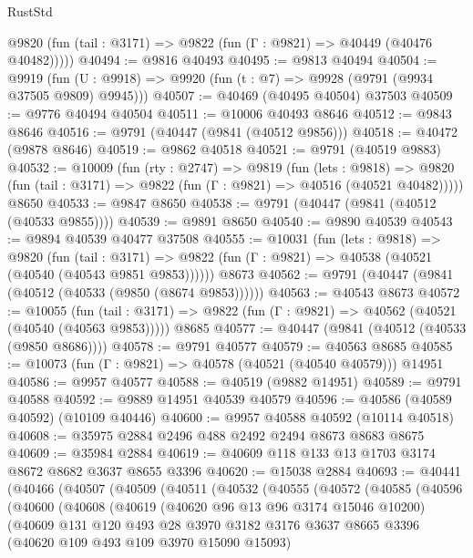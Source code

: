 \begin{lexlean}{RustStd}
\begin{coremodule}
      @9820 (fun (tail : @3171) => @9822 (fun (Γ : @9821) => @40449 (@40476 @40482)))))
@40494 := @9816 @40493
@40495 := @9813 @40494
@40504 := @9919
    (fun (U : @9918) => @9920 (fun (t : @7) => @9928 (@9791 (@9934 @37505 @9809) @9945)))
@40507 := @40469 (@40495 @40504) @37503
@40509 := @9776 @40494 @40504
@40511 := @10006 @40493 @8646
@40512 := @9843 @8646
@40516 := @9791 (@40447 (@9841 (@40512 @9856)))
@40518 := @40472 (@9878 @8646)
@40519 := @9862 @40518
@40521 := @9791 (@40519 @9883)
@40532 := @10009
    (fun (rty : @2747) =>
    @9819
      (fun (lets : @9818) =>
      @9820 (fun (tail : @3171) => @9822 (fun (Γ : @9821) => @40516 (@40521 @40482)))))
    @8650
@40533 := @9847 @8650
@40538 := @9791 (@40447 (@9841 (@40512 (@40533 @9855))))
@40539 := @9891 @8650
@40540 := @9890 @40539
@40543 := @9894 @40539 @40477 @37508
@40555 := @10031
    (fun (lets : @9818) =>
    @9820
      (fun (tail : @3171) =>
      @9822 (fun (Γ : @9821) => @40538 (@40521 (@40540 (@40543 @9851 @9853))))))
    @8673
@40562 := @9791 (@40447 (@9841 (@40512 (@40533 (@9850 (@8674 @9853))))))
@40563 := @40543 @8673
@40572 := @10055
    (fun (tail : @3171) => @9822 (fun (Γ : @9821) => @40562 (@40521 (@40540 (@40563 @9853)))))
    @8685
@40577 := @40447 (@9841 (@40512 (@40533 (@9850 @8686))))
@40578 := @9791 @40577
@40579 := @40563 @8685
@40585 := @10073 (fun (Γ : @9821) => @40578 (@40521 (@40540 @40579))) @14951
@40586 := @9957 @40577
@40588 := @40519 (@9882 @14951)
@40589 := @9791 @40588
@40592 := @9889 @14951 @40539 @40579
@40596 := @40586 (@40589 @40592) (@10109 @40446)
@40600 := @9957 @40588 @40592 (@10114 @40518)
@40608 := @35975 @2884 @2496 @488 @2492 @2494 @8673 @8683 @8675
@40609 := @35984 @2884
@40619 := @40609 @118 @133 @13 @1703 @3174 @8672 @8682 @3637 @8655 @3396
@40620 := @15038 @2884
@40693 := @40441
    (@40466
      (@40507
        (@40509
          (@40511
            (@40532
              (@40555
                (@40572
                  (@40585
                    (@40596
                      (@40600
                        (@40608
                          (@40619
                            (@40620 @96 @13 @96 @3174 @15046 @10200)
                            (@40609
                              @131
                              @120
                              @493
                              @28
                              @3970
                              @3182
                              @3176
                              @3637
                              @8665
                              @3396
                              (@40620 @109 @493 @109 @3970 @15090 @15093)

\end{coremodule}
\end{lexlean}
